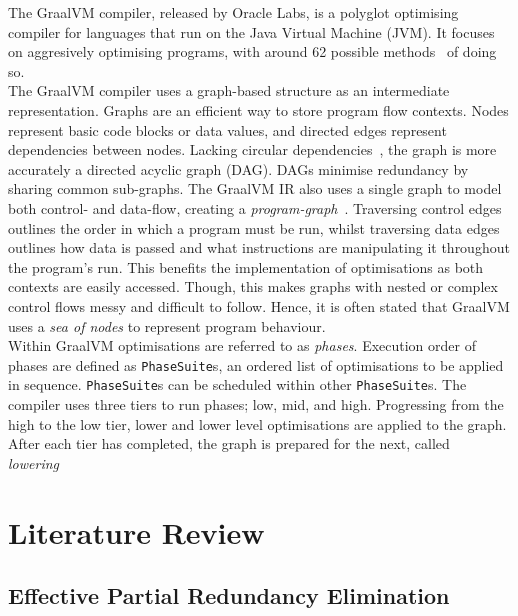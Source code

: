 \documentclass[12pt,openany,a4paper]{book}
\begin{document}
The GraalVM compiler, released by Oracle Labs, is a polyglot optimising compiler
for languages that run on the Java Virtual Machine (JVM). It focuses on aggresively
optimising programs, with around 62 possible methods~\cite{graalenterprise} of doing so.\\
The GraalVM compiler uses a graph-based structure as an intermediate
representation. Graphs are an efficient way to store program flow contexts. Nodes represent
basic code blocks or data values, and directed edges represent dependencies 
between nodes. Lacking circular dependencies~\cite{gir}, the graph is more accurately a
directed acyclic graph (DAG). DAGs minimise redundancy by sharing common sub-graphs.
The GraalVM IR also uses a single graph to model both control- and data-flow, 
creating a \emph{program-graph}~\cite{understanding}. Traversing control edges outlines the order in which
a program must be run, whilst traversing data edges outlines how data is
passed and what instructions are manipulating it throughout the program's run.
This benefits the implementation of optimisations as both contexts are easily
accessed. Though, this makes graphs with nested or complex control flows messy
and difficult to follow. Hence, it is often stated that GraalVM uses a
\emph{sea of nodes} to represent program behaviour.\\
Within GraalVM optimisations are referred to as \emph{phases}. Execution order of
phases are defined as \verb|PhaseSuite|s, an ordered list of optimisations to be
applied in sequence. \verb|PhaseSuite|s can be scheduled within other \verb|PhaseSuite|s.
The compiler uses three tiers to run phases; low, mid, and high. Progressing from
the high to the low tier, lower and lower level optimisations are applied to the
graph. After each tier has completed, the graph is prepared for the next, called
\emph{lowering}~\cite{poly-graal}

\chapter{Literature Review}
\label{litrev}

\section{Effective Partial Redundancy Elimination}
\label{litrev1}
\end{document}
